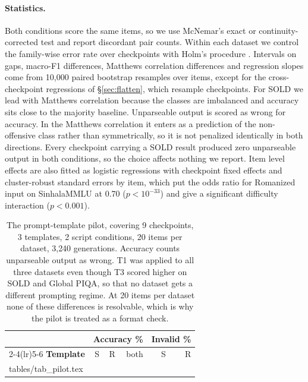 \documentclass{article}
\makeatletter
\newcommand{\rows}[1]{\@@input #1 }
\makeatother
\begin{document}
\paragraph{Statistics.} Both conditions score the same items, so we use McNemar's
exact or continuity-corrected test \citep{mcnemar-1947, dror-etal-2018-hitchhikers}
and report discordant pair counts. Within each dataset we control the family-wise
error rate over checkpoints with Holm's procedure \citep{holm-1979}. Intervals on
gaps, macro-F1 differences, Matthews correlation differences and regression slopes
come from 10{,}000 paired bootstrap resamples over items, except for the
cross-checkpoint regressions of \S\ref{sec:flatten}, which resample checkpoints. For
SOLD we lead with Matthews correlation \citep{matthews-1975, chicco-jurman-2020}
because the classes are imbalanced and accuracy sits close to the majority baseline.
Unparseable output is scored as wrong for accuracy. In the Matthews correlation it enters
as a prediction of the non-offensive class rather than symmetrically, so it is not
penalized identically in both directions. Every checkpoint carrying a SOLD result
produced zero unparseable output in both conditions, so the choice affects nothing we
report. Item level effects are also fitted as logistic regressions with checkpoint fixed
effects and cluster-robust standard errors by item, which put the odds ratio for
Romanized input on SinhalaMMLU at 0.70 ($p < 10^{-33}$) and give a significant
difficulty interaction ($p < 0.001$).

\begin{table}[t]
\caption{The prompt-template pilot, covering 9 checkpoints, 3 templates, 2 script conditions,
20 items per dataset, 3{,}240 generations. Accuracy counts unparseable output as
wrong. T1 was applied to all three datasets even though T3 scored higher on SOLD and
Global PIQA, so that no dataset gets a different prompting regime. At 20 items per
dataset none of these differences is resolvable, which is why the pilot is treated as
a format check.}
\label{tab:pilot}
\centering\small
\setlength{\tabcolsep}{3.2pt}
\begin{tabular}{@{}lrrrrr@{}}
\toprule
& \multicolumn{3}{c}{\textbf{Accuracy \%}} & \multicolumn{2}{c}{\textbf{Invalid \%}} \\
\cmidrule(lr){2-4}\cmidrule(lr){5-6}
\textbf{Template} & S & R & both & S & R \\
\midrule
\rows{tables/tab_pilot.tex}
\bottomrule
\end{tabular}
\end{table}
\end{document}
